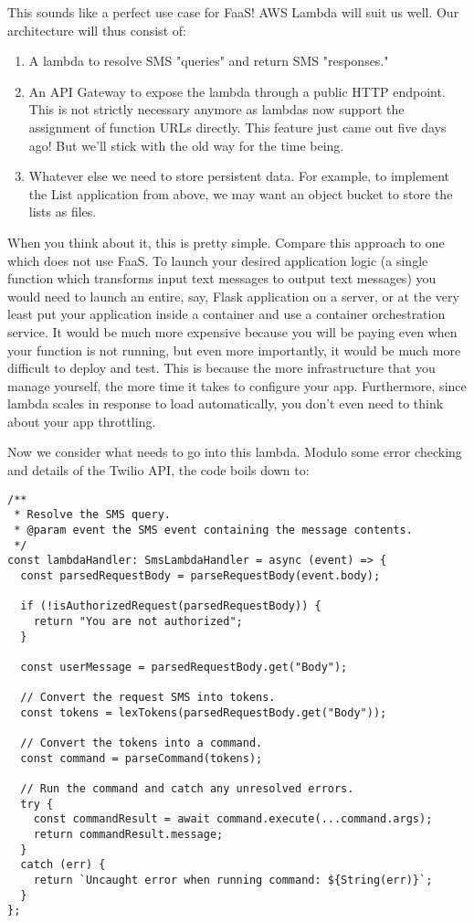 \documentclass{article}
\begin{document}
This sounds like a perfect use case for FaaS!
AWS Lambda will suit us well.
Our architecture will thus consist of:

\begin{enumerate}
  \item A lambda to resolve SMS "queries" and return SMS "responses."
  \item An API Gateway to expose the lambda through a public HTTP endpoint. This is not strictly necessary anymore as lambdas now support the assignment of function URLs directly. This feature just came out five days ago! But we'll stick with the old way for the time being.
  \item Whatever else we need to store persistent data.
    For example, to implement the List application from above, we may want an object bucket to store the lists as files.
\end{enumerate}

When you think about it, this is pretty simple.
Compare this approach to one which does not use FaaS.
To launch your desired application logic (a single function which transforms input text messages to output text messages) you would need to launch an entire, say, Flask application on a server, or at the very least put your application inside a container and use a container orchestration service.
It would be much more expensive because you will be paying even when your function is not running, but even more importantly, it would be much more difficult to deploy and test.
This is because the more infrastructure that you manage yourself, the more time it takes to configure your app.
Furthermore, since lambda scales in response to load automatically, you don't even need to think about your app throttling.

Now we consider what needs to go into this lambda.
Modulo some error checking and details of the Twilio API, the code boils down to:

\begin{verbatim}
/**
 * Resolve the SMS query.
 * @param event the SMS event containing the message contents.
 */
const lambdaHandler: SmsLambdaHandler = async (event) => {
  const parsedRequestBody = parseRequestBody(event.body);

  if (!isAuthorizedRequest(parsedRequestBody)) {
    return "You are not authorized";
  }

  const userMessage = parsedRequestBody.get("Body");

  // Convert the request SMS into tokens.
  const tokens = lexTokens(parsedRequestBody.get("Body"));

  // Convert the tokens into a command.
  const command = parseCommand(tokens);

  // Run the command and catch any unresolved errors.
  try {
    const commandResult = await command.execute(...command.args);
    return commandResult.message;
  }
  catch (err) {
    return `Uncaught error when running command: ${String(err)}`;
  }
};
\end{verbatim}
\end{document}
